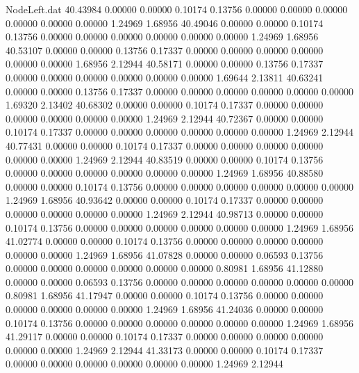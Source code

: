 \begin{filecontents}{NodeLeft.dat}
  40.43984    0.00000    0.00000     0.10174    0.13756    0.00000    0.00000    0.00000    0.00000    0.00000    0.00000    1.24969    1.68956
  40.49046    0.00000    0.00000     0.10174    0.13756    0.00000    0.00000    0.00000    0.00000    0.00000    0.00000    1.24969    1.68956
  40.53107    0.00000    0.00000     0.13756    0.17337    0.00000    0.00000    0.00000    0.00000    0.00000    0.00000    1.68956    2.12944
  40.58171    0.00000    0.00000     0.13756    0.17337    0.00000    0.00000    0.00000    0.00000    0.00000    0.00000    1.69644    2.13811
  40.63241    0.00000    0.00000     0.13756    0.17337    0.00000    0.00000    0.00000    0.00000    0.00000    0.00000    1.69320    2.13402
  40.68302    0.00000    0.00000     0.10174    0.17337    0.00000    0.00000    0.00000    0.00000    0.00000    0.00000    1.24969    2.12944
  40.72367    0.00000    0.00000     0.10174    0.17337    0.00000    0.00000    0.00000    0.00000    0.00000    0.00000    1.24969    2.12944
  40.77431    0.00000    0.00000     0.10174    0.17337    0.00000    0.00000    0.00000    0.00000    0.00000    0.00000    1.24969    2.12944
  40.83519    0.00000    0.00000     0.10174    0.13756    0.00000    0.00000    0.00000    0.00000    0.00000    0.00000    1.24969    1.68956
  40.88580    0.00000    0.00000     0.10174    0.13756    0.00000    0.00000    0.00000    0.00000    0.00000    0.00000    1.24969    1.68956
  40.93642    0.00000    0.00000     0.10174    0.17337    0.00000    0.00000    0.00000    0.00000    0.00000    0.00000    1.24969    2.12944
  40.98713    0.00000    0.00000     0.10174    0.13756    0.00000    0.00000    0.00000    0.00000    0.00000    0.00000    1.24969    1.68956
  41.02774    0.00000    0.00000     0.10174    0.13756    0.00000    0.00000    0.00000    0.00000    0.00000    0.00000    1.24969    1.68956
  41.07828    0.00000    0.00000     0.06593    0.13756    0.00000    0.00000    0.00000    0.00000    0.00000    0.00000    0.80981    1.68956
  41.12880    0.00000    0.00000     0.06593    0.13756    0.00000    0.00000    0.00000    0.00000    0.00000    0.00000    0.80981    1.68956
  41.17947    0.00000    0.00000     0.10174    0.13756    0.00000    0.00000    0.00000    0.00000    0.00000    0.00000    1.24969    1.68956
  41.24036    0.00000    0.00000     0.10174    0.13756    0.00000    0.00000    0.00000    0.00000    0.00000    0.00000    1.24969    1.68956
  41.29117    0.00000    0.00000     0.10174    0.17337    0.00000    0.00000    0.00000    0.00000    0.00000    0.00000    1.24969    2.12944
  41.33173    0.00000    0.00000     0.10174    0.17337    0.00000    0.00000    0.00000    0.00000    0.00000    0.00000    1.24969    2.12944

\end{filecontents}
